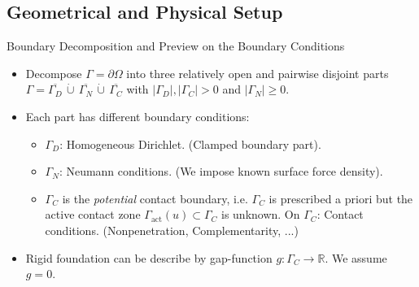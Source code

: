 \documentclass[10pt,aspectratio=169]{beamer}
\def\R{{\mathbb R}}
\begin{document}
\subsection{Geometrical and Physical Setup}

\begin{frame}{Boundary Decomposition and Preview on the Boundary Conditions}
	\begin{itemize}
		\item Decompose $\Gamma = \partial\Omega$ into three relatively open and pairwise disjoint parts $\Gamma = \overline{\Gamma_D}\,\mathbin{\dot\cup}\,\overline{\Gamma_N}\,\mathbin{\dot\cup}\,\overline{\Gamma_C}$ with $|\Gamma_D|,|\Gamma_C|>0$ and $|\Gamma_N|\ge 0$.
		\item Each part has different boundary conditions:
		      \begin{itemize}
			      \item $\Gamma_D$: Homogeneous Dirichlet. (Clamped boundary part).
			      \item $\Gamma_N$: Neumann conditions. (We impose known surface force density).
			      \item $\Gamma_C$ is the {\em potential} contact boundary, i.e. $\Gamma_C$ is prescribed a priori but the active contact zone $\Gamma_{\mathrm{act}}(u)\subset\Gamma_C$ is unknown. On $\Gamma_C$: Contact conditions. (Nonpenetration, Complementarity, ...)
		      \end{itemize}
		\item Rigid foundation can be describe by gap-function $g:\Gamma_C\to\R$. We assume $g = 0$.
	\end{itemize}
	\begin{figure}[!h]
		\centering
		
	\end{figure}
\end{frame}
\end{document}
